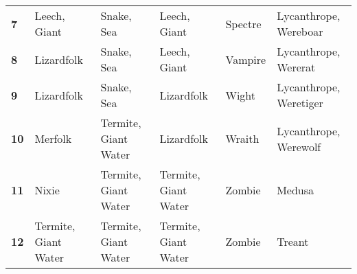 \begin {table}[H]
\begin{tabularx}{\columnwidth}{>{\bfseries}YYYYYY}
	7 & Leech, Giant & Snake, Sea & Leech, Giant & Spectre & Lycanthrope, Wereboar\\
	8 & Lizardfolk & Snake, Sea & Leech, Giant & Vampire & Lycanthrope, Wererat\\
	9 & Lizardfolk & Snake, Sea & Lizardfolk & Wight & Lycanthrope, Weretiger\\
	10 & Merfolk & Termite, Giant Water & Lizardfolk & Wraith & Lycanthrope, Werewolf\\
	11 & Nixie & Termite, Giant Water & Termite, Giant Water & Zombie & Medusa\\
	12 & Termite, Giant Water & Termite, Giant Water & Termite, Giant Water & Zombie & Treant
  \end {tabularx}
\end {table}

